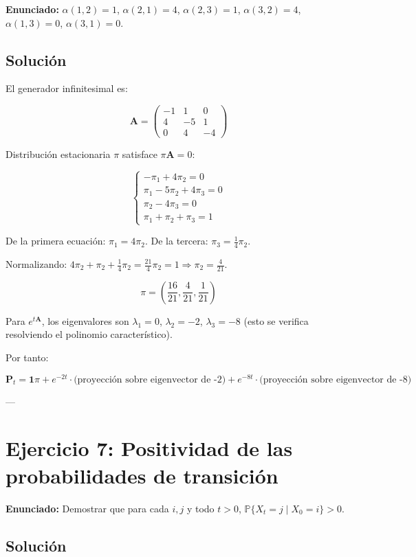 \documentclass{article}
\theoremstyle{definition}
\newcommand{\Prob}{\mathbb{P}}
\newcommand{\A}{\mathbf{A}}
\newcommand{\PP}{\mathbf{P}}
\newcommand{\ind}{\mathbf{1}}
\begin{document}
\textbf{Enunciado:} $\alpha(1,2) = 1$, $\alpha(2,1) = 4$, $\alpha(2,3) = 1$, $\alpha(3,2) = 4$, $\alpha(1,3) = 0$, $\alpha(3,1) = 0$.

\subsection*{Solución}

El generador infinitesimal es:

\[
\A = \begin{pmatrix}
    -1 & 1 & 0 \\
    4 & -5 & 1 \\
    0 & 4 & -4
\end{pmatrix}
\]

Distribución estacionaria $\pi$ satisface $\pi\A = 0$:

\[
\begin{cases}
    -\pi_1 + 4\pi_2 = 0 \\
    \pi_1 - 5\pi_2 + 4\pi_3 = 0 \\
    \pi_2 - 4\pi_3 = 0 \\
    \pi_1 + \pi_2 + \pi_3 = 1
\end{cases}
\]

De la primera ecuación: $\pi_1 = 4\pi_2$.  
De la tercera: $\pi_3 = \frac{1}{4}\pi_2$.

Normalizando: $4\pi_2 + \pi_2 + \frac{1}{4}\pi_2 = \frac{21}{4}\pi_2 = 1 \Rightarrow \pi_2 = \frac{4}{21}$.

\[
\pi = \left(\frac{16}{21}, \frac{4}{21}, \frac{1}{21}\right)
\]

Para $e^{t\A}$, los eigenvalores son $\lambda_1 = 0$, $\lambda_2 = -2$, $\lambda_3 = -8$ (esto se verifica resolviendo el polinomio característico).

Por tanto:

\[
\PP_t = \ind\pi + e^{-2t} \cdot \text{(proyección sobre eigenvector de -2)} + e^{-8t} \cdot \text{(proyección sobre eigenvector de -8)}
\]

---

\section*{Ejercicio 7: Positividad de las probabilidades de transición}

\textbf{Enunciado:} Demostrar que para cada $i, j$ y todo $t > 0$, $\Prob\{X_t = j \mid X_0 = i\} > 0$.

\subsection*{Solución}
\end{document}
